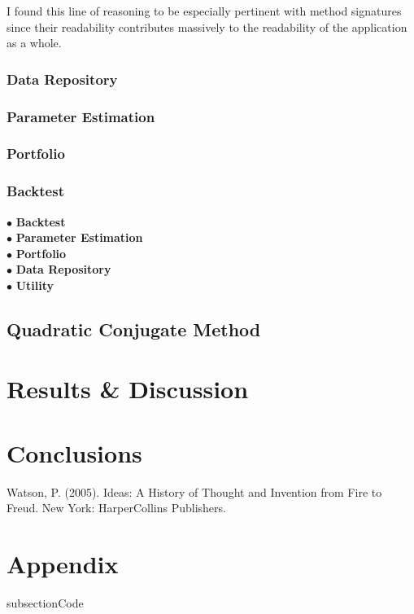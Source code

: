 \documentclass{article}
\begin{document}
I found this line of reasoning to be especially pertinent with method signatures since their readability contributes massively to the readability of the application as a whole.  


\subsubsection{Data Repository}
\label{sec:data_repository}


\subsubsection{Parameter Estimation}
\label{sec:parameter_estimation}


\subsubsection{Portfolio}
\label{sec:portfolio}


\subsubsection{Backtest}
\label{sec:backtestcode}





\begin{description}
	\item [$\bullet$ \textbf{Backtest}] 
	\item [$\bullet$ \textbf{Parameter Estimation}] 
	\item [$\bullet$ \textbf{Portfolio}] 
	\item [$\bullet$ \textbf{Data Repository}] 
	\item [$\bullet$ \textbf{Utility}] 	
\end{description}



\subsection{Quadratic Conjugate Method}
\label{sec:qcm}


\section{Results \& Discussion}
\label{sec:results}


\section{Conclusions}
\label{sec:concs}



\begin{thebibliography}{}
\label{sec:thebibliography}
	 Watson, P. (2005). Ideas: A History of Thought and Invention from Fire to Freud. New York: HarperCollins Publishers.
	
	
\end{thebibliography} 



\section{Appendix} 
\label{sec:appendix}

subsection{Code} 
\label{sec:code}
\end{document}
